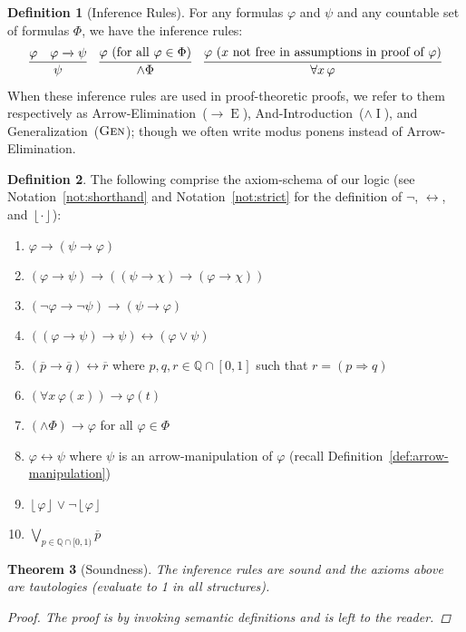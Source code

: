 \documentclass{amsart}
\newtheorem{theorem}{Theorem}[section]
\theoremstyle{definition}
\newtheorem{definition}[theorem]{Definition}
\numberwithin{equation}{theorem}
\renewcommand{\phi}{\varphi}
\newcommand{\Q}{\mathbb{Q}}
\newcommand{\unwedge}{{\wedge}}
\newcommand{\strict}[1]{{\left\lfloor#1\right\rfloor}}
\newcommand{\rat}[1]{{\overline{#1}}}
\newcommand{\narrow}[1]{\xrightarrow{#1}}
\renewcommand{\to}{\narrow{}}
\newcommand{\arr}{{\to}}
\newcommand{\intro}{\!\operatorname{I}}
\newcommand{\elim}{\!\operatorname{E}}
\newcommand{\generalization}{\text{\sc{Gen}}}
\begin{document}
\begin{definition}[Inference Rules]
  For any formulas $\phi$ and $\psi$ and any countable set of formulas $\Phi$, we have the inference rules:
  \begin{align*}
    \infer{\psi}{\phi & \phi\to\psi} &&
    \infer{\unwedge\Phi}{\phi\text{ (for all $\phi\in\Phi$)}} &&
    \infer{\forall x\,\phi}{\phi\text{ ($x$ not free in assumptions in proof of $\phi$)}}
  \end{align*}
  When these inference rules are used in proof-theoretic proofs, we refer to them respectively as Arrow-Elimination~($\arr\elim$), And-Introduction~($\unwedge\intro$), and Generalization~($\generalization$); though we often write modus ponens instead of Arrow-Elimination.
\end{definition}
\begin{definition}
  The following comprise the axiom-schema of our logic (see Notation~\ref{not:shorthand} and Notation~\ref{not:strict} for the definition of $\neg$, $\leftrightarrow$, and $\strict{\cdot}$):
	\begin{enumerate}[label=(A\arabic*)]
		\item\label{itm:axiom-weakening}
			$\phi\to(\psi\to\phi)$
		\item\label{itm:axiom-trans}
			$(\phi\to\psi)\to((\psi\to\chi)\to(\phi\to\chi))$
		\item
		  $(\neg\phi\to\neg\psi)\to(\psi\to\phi)$
		\item\label{itm:axiom-vee}
			$((\phi\to\psi)\to\psi)\leftrightarrow(\phi\vee\psi)$
		\item\label{itm:axiom-rationals}
			$(\rat p\rightarrow\rat q)\leftrightarrow \rat r$ where $p,q,r\in\Q\cap[0,1]$ such that $r=(p\Rightarrow q)$
		\item\label{itm:axiom-forall-arrow}
			$(\forall x\,\phi(x))\rightarrow\phi(t)$
		\item\label{itm:axiom-and}
			$(\unwedge\Phi)\rightarrow\phi$ for all $\phi\in\Phi$
		\item\label{itm:axiom-pushdown}
			$\phi\leftrightarrow\psi$ where $\psi$ is an arrow-manipulation of $\phi$ (recall Definition~\ref{def:arrow-manipulation})
	  \item\label{itm:axiom-loe}
      $\strict\phi\vee\neg\strict\phi$
	  \item\label{itm:axiom-approach}
      $\bigvee_{p\in\Q\cap[0,1)}\rat p$	  
		\end{enumerate}
\end{definition}
\begin{theorem}[Soundness]
  The inference rules are sound and the axioms above are tautologies (evaluate to 1 in all structures).
  \begin{proof}
    The proof is by invoking semantic definitions and is left to the reader.
  \end{proof}
\end{theorem}
\end{document}

